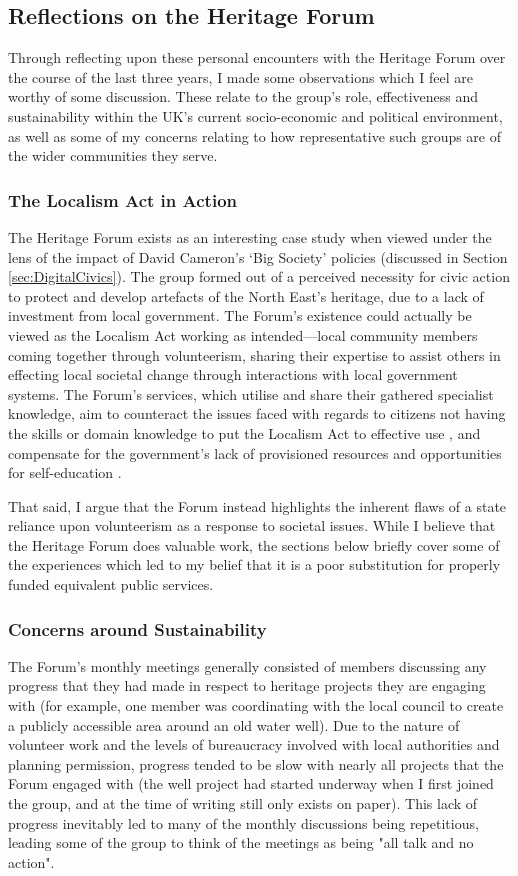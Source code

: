 \subsection{Reflections on the Heritage Forum}
Through reflecting upon these personal encounters with the Heritage Forum over the course of the last three years, I made some observations which I feel are worthy of some discussion. These relate to the group's role, effectiveness and sustainability within the UK's current socio-economic and political environment, as well as some of my concerns relating to how representative such groups are of the wider communities they serve.

\subsubsection{The Localism Act in Action}
The Heritage Forum exists as an interesting case study when viewed under the lens of the impact of David Cameron's `Big Society' policies (discussed in Section \ref{sec:DigitalCivics}). The group formed out of a perceived necessity for civic action to protect and develop artefacts of the North East's heritage, due to a lack of investment from local government. The Forum's existence could actually be viewed as the Localism Act working as intended---local community members coming together through volunteerism, sharing their expertise to assist others in effecting local societal change through interactions with local government systems. The Forum's services, which utilise and share their gathered specialist knowledge, aim to counteract the issues faced with regards to citizens not having the skills or domain knowledge to put the Localism Act to effective use \citep{BBCSundayPolitics2013}, and compensate for the government's lack of provisioned resources and opportunities for self-education \citep{BenRogers2010a}. 

That said, I argue that the Forum instead highlights the inherent flaws of a state reliance upon volunteerism as a response to societal issues. While I believe that the Heritage Forum does valuable work, the sections below briefly cover some of the experiences which led to my belief that it is a poor substitution for properly funded equivalent public services.

\subsubsection{Concerns around Sustainability}
The Forum's monthly meetings generally consisted of members discussing any progress that they had made in respect to heritage projects they are engaging with (for example, one member was coordinating with the local council to create a publicly accessible area around an old water well). Due to the nature of volunteer work and the levels of bureaucracy involved with local authorities and planning permission, progress tended to be slow with nearly all projects that the Forum engaged with (the well project had started underway when I first joined the group, and at the time of writing still only exists on paper). This lack of progress inevitably led to many of the monthly discussions being repetitious, leading some of the group to think of the meetings as being "all talk and no action".


